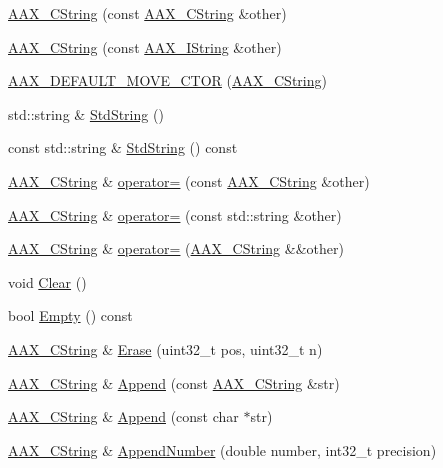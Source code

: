 \begin{DoxyCompactItemize}
\mbox{\hyperlink{a01573_a5d27338ab3b3175c1e0e7e13bf6dab03}{A\+A\+X\+\_\+\+C\+String}} (const \mbox{\hyperlink{a01573}{A\+A\+X\+\_\+\+C\+String}} \&other)
\item 
\mbox{\hyperlink{a01573_a46d28b14a31fca79480d2f4ce9446939}{A\+A\+X\+\_\+\+C\+String}} (const \mbox{\hyperlink{a01873}{A\+A\+X\+\_\+\+I\+String}} \&other)
\item 
\mbox{\hyperlink{a01573_ae1fe4077b3d29193d739f6504d41cb5f}{A\+A\+X\+\_\+\+D\+E\+F\+A\+U\+L\+T\+\_\+\+M\+O\+V\+E\+\_\+\+C\+T\+OR}} (\mbox{\hyperlink{a01573}{A\+A\+X\+\_\+\+C\+String}})
\item 
std\+::string \& \mbox{\hyperlink{a01573_a4ce07d506cd4262a5e763c7d30c30740}{Std\+String}} ()
\item 
const std\+::string \& \mbox{\hyperlink{a01573_aa620aa582f7a5eda1c6559f0869dce6f}{Std\+String}} () const
\item 
\mbox{\hyperlink{a01573}{A\+A\+X\+\_\+\+C\+String}} \& \mbox{\hyperlink{a01573_ae62cc4543c9ac4d8682176474c46d8d2}{operator=}} (const \mbox{\hyperlink{a01573}{A\+A\+X\+\_\+\+C\+String}} \&other)
\item 
\mbox{\hyperlink{a01573}{A\+A\+X\+\_\+\+C\+String}} \& \mbox{\hyperlink{a01573_ad6db6f32c710ef0897ca09cb8ff9f3be}{operator=}} (const std\+::string \&other)
\item 
\mbox{\hyperlink{a01573}{A\+A\+X\+\_\+\+C\+String}} \& \mbox{\hyperlink{a01573_a1b9dad34f5acb197595c69373193f794}{operator=}} (\mbox{\hyperlink{a01573}{A\+A\+X\+\_\+\+C\+String}} \&\&other)
\item 
void \mbox{\hyperlink{a01573_a866d456c7cad181d1feda559a0ca3d07}{Clear}} ()
\item 
bool \mbox{\hyperlink{a01573_a464d3585163efb0cc4b3169ffc5f7101}{Empty}} () const
\item 
\mbox{\hyperlink{a01573}{A\+A\+X\+\_\+\+C\+String}} \& \mbox{\hyperlink{a01573_a78ab9164c3b4aa17d13191fc7ea14fc0}{Erase}} (uint32\+\_\+t pos, uint32\+\_\+t n)
\item 
\mbox{\hyperlink{a01573}{A\+A\+X\+\_\+\+C\+String}} \& \mbox{\hyperlink{a01573_a53b726507fec5a24ffb46e9af194a958}{Append}} (const \mbox{\hyperlink{a01573}{A\+A\+X\+\_\+\+C\+String}} \&str)
\item 
\mbox{\hyperlink{a01573}{A\+A\+X\+\_\+\+C\+String}} \& \mbox{\hyperlink{a01573_a6ed6be18fcfa25acfeb7967e282d9fa8}{Append}} (const char $\ast$str)
\item 
\mbox{\hyperlink{a01573}{A\+A\+X\+\_\+\+C\+String}} \& \mbox{\hyperlink{a01573_a3b04d5d9e161a75be5bfe71cfb15d4dc}{Append\+Number}} (double number, int32\+\_\+t precision)

\end{DoxyCompactItemize}

